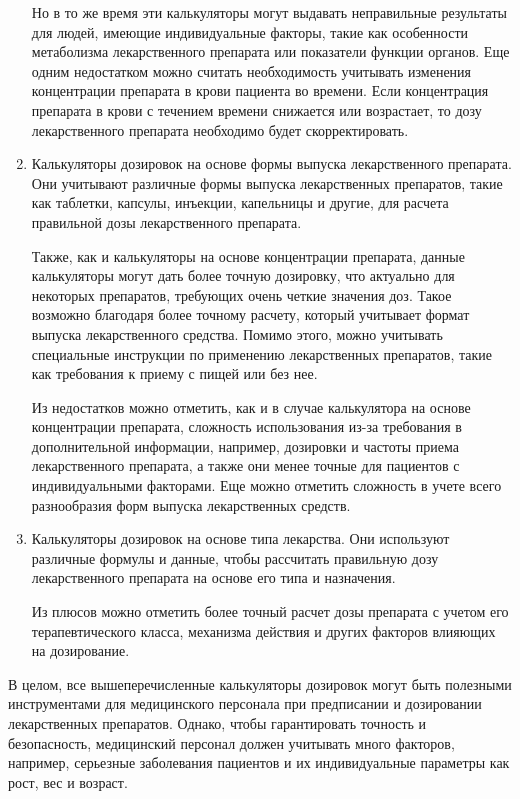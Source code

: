 \begin{enumerate}
Но в то же время эти калькуляторы могут выдавать неправильные результаты для людей, имеющие индивидуальные факторы, такие как особенности метаболизма лекарственного препарата или  показатели функции органов. Еще одним недостатком можно считать необходимость учитывать изменения концентрации препарата в крови пациента во времени. Если концентрация препарата в крови с течением времени снижается или возрастает, то дозу лекарственного препарата необходимо будет скорректировать.

\item Калькуляторы дозировок на основе формы выпуска лекарственного препарата. Они учитывают различные формы выпуска лекарственных препаратов, такие как таблетки, капсулы, инъекции, капельницы и другие, для расчета правильной дозы лекарственного препарата.

Также, как и калькуляторы на основе концентрации препарата, данные калькуляторы могут дать более точную дозировку, что актуально для некоторых препаратов, требующих очень четкие значения доз. Такое возможно благодаря более точному расчету, который учитывает формат выпуска лекарственного средства. Помимо этого, можно учитывать специальные инструкции по применению лекарственных препаратов, такие как требования к приему с пищей или без нее.

Из недостатков можно отметить, как и в случае калькулятора на основе концентрации препарата, сложность использования из-за требования в дополнительной информации, например, дозировки и частоты приема лекарственного препарата, а также они менее точные для пациентов с индивидуальными факторами. Еще можно отметить сложность в учете всего разнообразия форм выпуска лекарственных средств.

\item Калькуляторы дозировок на основе типа лекарства. Они используют различные формулы и данные, чтобы рассчитать правильную дозу лекарственного препарата на основе его типа и назначения.

Из плюсов можно отметить более точный расчет дозы препарата с учетом его терапевтического класса, механизма действия и других факторов влияющих на дозирование.
\end{enumerate}

В целом, все вышеперечисленные калькуляторы дозировок могут быть полезными инструментами для медицинского персонала при предписании и дозировании лекарственных препаратов. Однако, чтобы гарантировать точность и безопасность, медицинский персонал должен учитывать много факторов, например, серьезные заболевания пациентов и их индивидуальные параметры как рост, вес и возраст.

